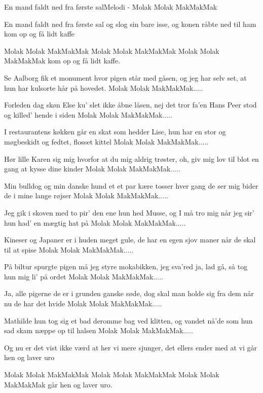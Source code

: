 \begin{sang}{En mand faldt ned fra første sal}{Melodi - Molak Molak MakMakMak}
\begin{vers}
En mand faldt ned fra første sal
og slog sin bare isse,
og konen råbte ned til ham
kom op og få lidt kaffe
\end{vers}
\begin{omkvaed}
Molak Molak MakMakMak 
Molak Molak MakMakMak 
Molak Molak MakMakMak 
kom op og få lidt kaffe.
\end{omkvaed}
\begin{vers}
Se Aalborg fik et monument
hvor pigen står med gåsen,
og jeg har selv set, at hun har
kulsorte hår på hovedet.
Molak Molak MakMakMak.....
\end{vers}
\begin{vers}
Forleden dag skøn Else ku'
slet ikke åbne låsen,
nej det tror fa'en Hans Peer stod
og killed' hende i siden
Molak Molak MakMakMak.....
\end{vers}
\begin{vers}
I restaurantens køkken går
en skat som hedder Lise,
hun har en stor og møgbeskidt
og fedtet, flosset kittel
Molak Molak MakMakMak.....
\end{vers}
\begin{vers}
Hør lille Karen sig mig hvorfor
at du mig aldrig trøster,
oh, giv mig lov til blot en gang
at kysse dine kinder
Molak Molak MakMakMak.....
\end{vers}
\begin{vers}
Min bulldog og min danske hund
et et par kære tosser
hver gang de ser mig bider de
i mine lange røjser
Molak Molak MakMakMak.....
\end{vers}
\vbox{}\vfill
\begin{vers}
Jeg gik i skoven med to pir'
den ene hun hed Musse,
og I må tro mig når jeg sir'
hun had' en mægtig hat på
Molak Molak MakMakMak.....
\end{vers}
\begin{vers}
Kineser og Japaner er
i huden meget gule,
de har en egen sjov maner
når de skal til at spise
Molak Molak MakMakMak.....
\end{vers}
\begin{vers} 
På biltur spurgte pigen må
jeg styre mokabikken,
jeg sva'red ja, lad gå, så
tog hun mig li' på ordet
Molak Molak MakMakMak.....
\end{vers}
\begin{vers} 
Ja, alle pigerne de er
i grunden ganske søde,
dog skal man holde sig fra dem
når nu de har det hvide
Molak Molak MakMakMak.....
\end{vers}
\begin{vers}
Mathilde hun tog sig et bad
deromme bag ved klitten,
og vandet nå'de som hun sad
skam næppe op til halsen
Molak Molak MakMakMak.....
\end{vers}
\begin{vers}
Og nu er det vist ikke værd
at her vi mere sjunger,
det ellers ender med at vi
går hen og laver uro
\end{vers}
\begin{omkvaed}
Molak Molak MakMakMak
Molak Molak MakMakMak
Molak Molak MakMakMak
går hen og laver uro.
\end{omkvaed}
\laps
\end{sang}